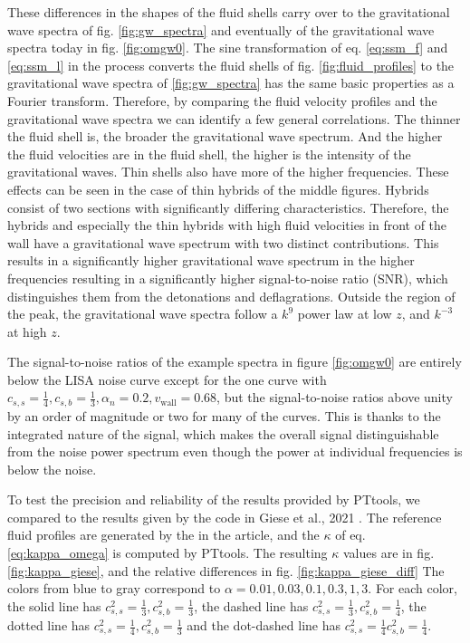 These differences in the shapes of the fluid shells carry over to the gravitational wave spectra of fig. \ref{fig:gw_spectra} and eventually of the gravitational wave spectra today in fig. \ref{fig:omgw0}.
The sine transformation of eq. \eqref{eq:ssm_f} and \eqref{eq:ssm_l} in the process converts the fluid shells of fig. \ref{fig:fluid_profiles} to the gravitational wave spectra of \ref{fig:gw_spectra} has the same basic properties as a Fourier transform.
Therefore, by comparing the fluid velocity profiles and the gravitational wave spectra we can identify a few general correlations.
The thinner the fluid shell is, the broader the gravitational wave spectrum.
And the higher the fluid velocities are in the fluid shell, the higher is the intensity of the gravitational waves.
Thin shells also have more of the higher frequencies.
These effects can be seen in the case of thin hybrids of the middle figures.
Hybrids consist of two sections with significantly differing characteristics.
Therefore, the hybrids and especially the thin hybrids with high fluid velocities in front of the wall have a gravitational wave spectrum with two distinct contributions.
This results in a significantly higher gravitational wave spectrum in the higher frequencies resulting in a significantly higher signal-to-noise ratio (SNR),
which distinguishes them from the detonations and deflagrations.
Outside the region of the peak, the gravitational wave spectra follow a $k^9$ power law at low $z$,
and $k^{-3}$ at high $z$.

The signal-to-noise ratios of the example spectra in figure \ref{fig:omgw0}
are entirely below the LISA noise curve except for the one curve with
$c_{s,s} = \frac{1}{4}, c_{s,b} = \frac{1}{3}, \alpha_n = 0.2, v_\text{wall} = 0.68$,
but the signal-to-noise ratios above unity by an order of magnitude or two for many of the curves.
This is thanks to the integrated nature of the signal,
which makes the overall signal distinguishable from the noise power spectrum even though the power at individual frequencies is below the noise.
\cite{thrane_sensitivity_2013}


To test the precision and reliability of the results provided by PTtools,
we compared to the results given by the code in  Giese et al., 2021 \cite[fig. 2]{giese_2021}.
The reference fluid profiles are generated by the in the article,
and the $\kappa$ of eq. \eqref{eq:kappa_omega} is computed by PTtools.
The resulting $\kappa$ values are in fig. \ref{fig:kappa_giese},
and the relative differences in fig. \ref{fig:kappa_giese_diff}
The colors from blue to gray correspond to $\alpha = 0.01, 0.03, 0.1, 0.3, 1, 3$.
For each color, the solid line has $c_{s,s}^2 = \frac{1}{3}, c_{s,b}^2 = \frac{1}{3}$,
the dashed line has $c_{s,s}^2 = \frac{1}{3}, c_{s,b}^2 = \frac{1}{4}$,
the dotted line has $c_{s,s}^2 = \frac{1}{4}, c_{s,b}^2 = \frac{1}{3}$
and the dot-dashed line has $c_{s,s}^2 = \frac{1}{4} c_{s,b}^2 = \frac{1}{4}$.

